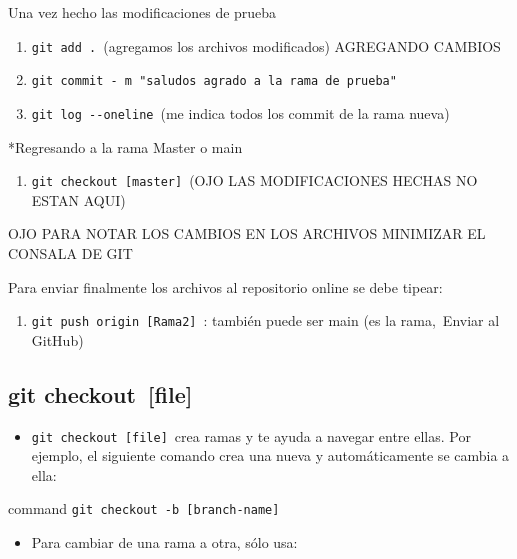 \documentclass[
  a2paper,
]{article}
\providecommand{\tightlist}{%
  \setlength{\itemsep}{0pt}\setlength{\parskip}{0pt}}\usepackage{longtable,booktabs,array}
\begin{document}
Una vez hecho las modificaciones de prueba~~

\begin{enumerate}
\def\labelenumi{\arabic{enumi}.}
\setcounter{enumi}{4}
\tightlist
\item
  \texttt{git\ add\ .}~(agregamos los archivos modificados) AGREGANDO
  CAMBIOS
\item
  \texttt{git\ commit\ -\ m\ "saludos\ agrado\ a\ la\ rama\ de\ prueba"}
\item
  \texttt{git\ log\ -\/-oneline}~(me indica todos los commit de la rama
  nueva)
\end{enumerate}

*Regresando a la rama Master o main

\begin{enumerate}
\def\labelenumi{\arabic{enumi}.}
\setcounter{enumi}{7}
\tightlist
\item
  \texttt{git\ checkout~{[}master{]}}~(OJO LAS MODIFICACIONES HECHAS NO
  ESTAN AQUI)
\end{enumerate}

OJO PARA NOTAR LOS CAMBIOS EN LOS ARCHIVOS MINIMIZAR EL CONSALA DE GIT

Para enviar finalmente los archivos al repositorio online se debe
tipear:

\begin{enumerate}
\def\labelenumi{\arabic{enumi}.}
\setcounter{enumi}{8}
\tightlist
\item
  \texttt{git\ push\ origin~{[}Rama2{]}}~: también puede ser main (es la
  rama,~Enviar al GitHub)
\end{enumerate}

\hypertarget{git-checkout-file}{%
\subsection{git checkout~{[}file{]}}\label{git-checkout-file}}

\begin{itemize}
\tightlist
\item
  \texttt{git\ checkout\ {[}file{]}}~crea ramas y te ayuda a navegar
  entre ellas. Por ejemplo, el siguiente comando crea una nueva y
  automáticamente se cambia a ella:
\end{itemize}

command \texttt{git\ checkout\ -b~{[}branch-name{]}}~~

\begin{itemize}
\tightlist
\item
  Para cambiar de una rama a otra, sólo usa:
\end{itemize}
\end{document}

